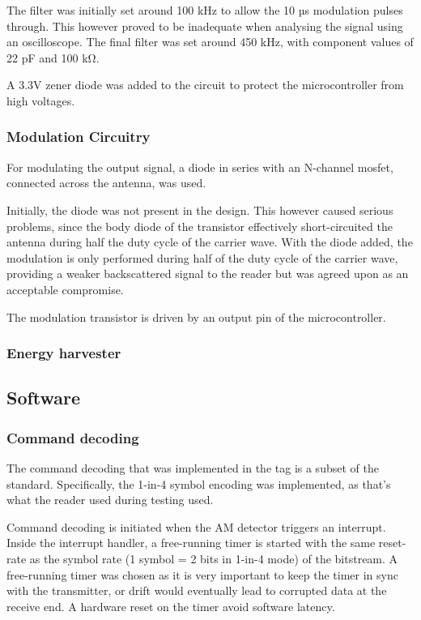 The filter was initially set around 100 kHz to allow the 10 µs modulation pulses\cite{rfid-iso} through.
This however proved to be inadequate when analysing the signal using an oscilloscope.
The final filter was set around 450 kHz, with component values of 22 pF and 100 kΩ.

A 3.3V zener diode was added to the circuit to protect the microcontroller from high voltages.

\subsubsection{Modulation Circuitry}
For modulating the output signal, a diode in series with an N-channel mosfet, connected across the antenna, was used.

Initially, the diode was not present in the design.
This however caused serious problems, since the body diode of the transistor effectively short-circuited the antenna during half the duty cycle of the carrier wave.
With the diode added, the modulation is only performed during half of the duty cycle of the carrier wave, providing a weaker backscattered signal to the reader but was agreed upon as an acceptable compromise.

The modulation transistor is driven by an output pin of the microcontroller.

\subsubsection{Energy harvester}


\subsection{Software}

\subsubsection{Command decoding}
The command decoding that was implemented in the tag is a subset of the standard. Specifically, the
1-in-4 symbol encoding was implemented, as that's what the reader used during testing used.

Command decoding is initiated when the AM detector triggers an interrupt. Inside the interrupt handler,
a free-running timer is started with the same reset-rate as the symbol rate (1 symbol = 2 bits in 1-in-4 mode)
of the bitstream. A free-running timer was chosen as it is very important to keep the timer in sync with
the transmitter, or drift would eventually lead to corrupted data at the receive end. A hardware
reset on the timer avoid software latency.

